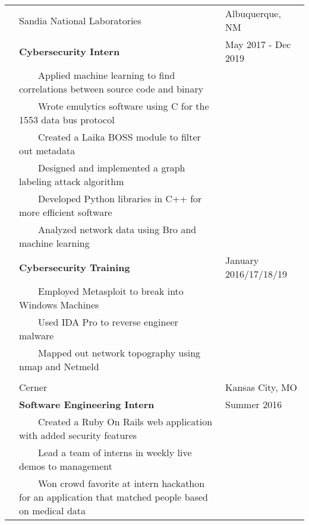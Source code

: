 \documentclass[10.5pt, arial]{article}
\newcommand{\tabitem}{~~\llap{\textbullet}~~}
\begin{document}
\begin{longtable}{p{1.5cm} p{13.2cm} l}
            & Sandia National Laboratories	& Albuquerque, NM 		\\
			& \textbf{Cybersecurity Intern}										& May 2017 - Dec 2019 	\\
			& \tabitem Applied machine learning to find correlations between source code and binary & 	\\
			& \tabitem Wrote emulytics software using C for the 1553 data bus protocol 	&			\\
			& \tabitem Created a Laika BOSS module to filter out metadata		&						\\
            & \tabitem Designed and implemented a graph labeling attack algorithm 	&     				\\
            & \tabitem Developed Python libraries in C++ for more efficient software 	& 				\\
            & \tabitem Analyzed network data using Bro and machine learning 			& 				\\
            & \textbf{Cybersecurity Training} 									& January 2016/17/18/19 \\
			& \tabitem Employed Metasploit to break into Windows Machines		&	 					\\
			& \tabitem Used IDA Pro to reverse engineer malware 				& 						\\
			& \tabitem Mapped out network topography using nmap and Netmeld		&						\\ \\
\pagebreak
			& Cerner 															& Kansas City, MO 		\\
			& \textbf{Software Engineering Intern} 								& Summer 2016			\\
			& \tabitem Created a Ruby On Rails web application with added security features	& 			\\
			& \tabitem Lead a team of interns in weekly live demos to management 			&    		\\
            & \tabitem Won crowd favorite at intern hackathon for an application that matched people based on medical data   &                       \\
\end{longtable}
\end{document}
